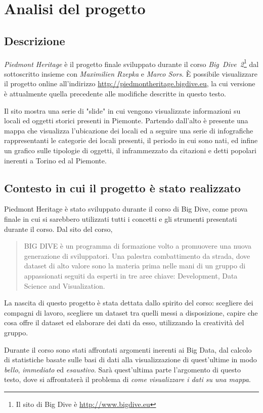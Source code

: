 \chapter{Analisi del progetto}\label{sec:piedmontheritage}
	\section{Descrizione}
	\emph{Piedmont Heritage} è il progetto finale sviluppato durante il corso \emph{Big~Dive~2}\footnote{Il sito di Big Dive è \url{http://www.bigdive.eu}} dal sottoscritto insieme con \emph{Maximilien Rzepka} e \emph{Marco Sors}. \`{E} possibile visualizzare il progetto online all'indirizzo \url{http://piedmontheritage.bigdive.eu}, la cui versione è attualmente quella precedente alle modifiche descritte in questo testo.
	
	Il sito mostra una serie di "slide" in cui vengono visualizzate informazioni su locali ed oggetti storici presenti in Piemonte. Partendo dall'alto è presente una mappa che visualizza l'ubicazione dei locali ed a seguire una serie di infografiche rappresentanti le categorie dei locali presenti, il periodo in cui sono nati, ed infine un grafico sulle tipologie di oggetti, il inframmezzato da citazioni e detti popolari inerenti a Torino ed al Piemonte.
	
	\section{Contesto in cui il progetto è stato realizzato}
	Piedmont Heritage è stato sviluppato durante il corso di Big Dive, come prova finale in cui si sarebbero utilizzati tutti i concetti e gli strumenti presentati durante il corso. Dal sito del corso, \begin{quote}
	BIG DIVE è un programma di formazione volto a promuovere una nuova generazione di sviluppatori.
	Una palestra combattimento da strada, dove dataset di alto valore sono la materia prima nelle mani di un gruppo di appassionati seguiti da esperti in tre aree chiave: 
	Development, Data Science and Visualization.
	\end{quote}
	La nascita di questo progetto è stata dettata dallo spirito del corso: scegliere dei compagni di lavoro, scegliere un dataset tra quelli messi a disposizione, capire che cosa offre il dataset ed elaborare dei dati da esso, utilizzando la creatività del gruppo.
	
	Durante il corso sono stati affrontati argomenti inerenti ai Big Data, dal calcolo di statistiche basate sulle basi di dati alla visualizzazione di quest'ultime in modo \emph{bello}, \emph{immediato} ed \emph{esaustivo}. Sarà quest'ultima parte l'argomento di questo testo, dove si affrontaterà il problema di \emph{come visualizzare i dati su una mappa}.
	
